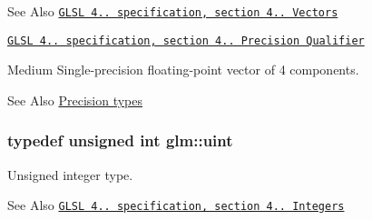 \begin{DoxySeeAlso}{See Also}
\href{http://www.opengl.org/registry/doc/GLSLangSpec.4.20.8.pdf}{\tt G\-L\-S\-L 4.. specification, section 4.. Vectors} 

\href{http://www.opengl.org/registry/doc/GLSLangSpec.4.20.8.pdf}{\tt G\-L\-S\-L 4.. specification, section 4.. Precision Qualifier}
\end{DoxySeeAlso}
Medium Single-\/precision floating-\/point vector of 4 components. \begin{DoxySeeAlso}{See Also}
\hyperlink{group__core__precision}{Precision types} 
\end{DoxySeeAlso}
\hypertarget{group__core__precision_ga4fd29415871152bfb5abd588334147c8}{
\subsubsection[{uint}]{\setlength{\rightskip}{0pt plus 5cm}typedef unsigned int {\bf glm\-::uint}}}\label{group__core__precision_ga4fd29415871152bfb5abd588334147c8}
Unsigned integer type.

\begin{DoxySeeAlso}{See Also}
\href{http://www.opengl.org/registry/doc/GLSLangSpec.4.20.8.pdf}{\tt G\-L\-S\-L 4.. specification, section 4.. Integers} 
\end{DoxySeeAlso}
